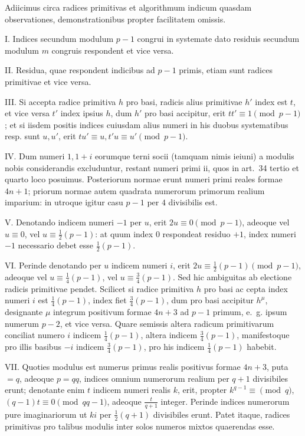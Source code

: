 Adiicimus circa radices primitivas et algorithmum indicum quasdam observationes, demonstrationibus propter facilitatem omissis.

I. Indices secundum modulum $p-1$ congrui in systemate dato residuis secundum modulum $m$ congruis respondent et vice versa.

II. Residua, quae respondent indicibus ad $p-1$ primis, etiam sunt radices primitivae et vice versa.

III. Si accepta radice primitiva $h$ pro basi, radicis alius primitivae $h'$ index est $t$, et vice versa $t'$ index ipsius $h$, dum $h'$ pro basi accipitur, erit $tt'\equiv1\pmod{p-1}$; et si iisdem positis indices cuiusdam alius numeri in his duobus systematibus resp. sunt $u,u'$, erit $tu'\equiv u,t'u\equiv u'\pmod{p-1}$.

IV. Dum numeri $1,1+i$ eorumque terni socii (tamquam nimis ieiuni) a modulis nobis considerandis excluduntur, restant numeri primi ii, quos in art.~34 tertio et quarto loco posuimus. Posteriorum normae erunt numeri primi reales formae $4n+1$; priorum normae autem quadrata numerorum primorum realium imparium: in utroque igitur casu $p-1$ per $4$ divisibilis est.

V. Denotando indicem numeri $-1$ per $u$, erit $2u\equiv0\pmod{p-1}$, adeoque vel $u\equiv0$, vel $u\equiv\frac12(p-1)$: at quum index $0$ respondeat residuo $+1$, index numeri $-1$ necessario debet esse $\frac12(p-1)$.

VI. Perinde denotando per $u$ indicem numeri $i$, erit $2u\equiv\frac12(p-1)\pmod{p-1}$, adeoque vel $u\equiv\frac14(p-1)$, vel $u\equiv\frac34(p-1)$. Sed hic ambiguitas ab electione radicis primitivae pendet. Scilicet si radice primitiva $h$ pro basi ac%
%
cepta index numeri $i$ est $\frac14(p-1)$, index fiet $\frac34(p-1)$, dum pro basi accipitur $h^\mu$, designante $\mu$ integrum positivum formae $4n+3$ ad $p-1$ primum, e.~g. ipsum numerum $p-2$, et vice versa. Quare semissis altera radicum primitivarum conciliat numero $i$ indicem $\frac14(p-1)$, altera indicem $\frac34(p-1)$, manifestoque pro illis basibus $-i$ indicem $\frac34(p-1)$, pro his indicem $\frac14(p-1)$ habebit.

VII. Quoties modulus est numerus primus realis positivus formae $4n+3$, puta $=q$, adeoque $p=qq$, indices omnium numerorum realium per $q+1$ divisibiles erunt; denotante enim $t$ indicem numeri realis $k$, erit, propter $k^{q-1}\equiv\pmod q$, $(q-1)t\equiv0\pmod{qq-1}$, adeoque $\frac{t}{q+1}$ integer. Perinde indices numerorum pure imaginariorum ut $ki$ per $\frac12(q+1)$ divisibiles erunt. Patet itaque, radices primitivas pro talibus modulis inter solos numeros mixtos quaerendas esse.

